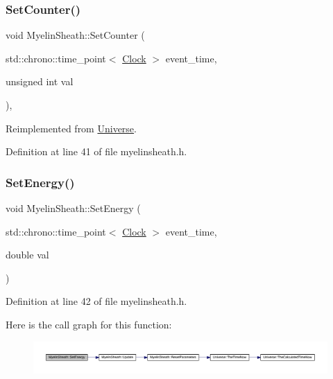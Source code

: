 \subsubsection{\texorpdfstring{Set\+Counter()}{SetCounter()}}
{\footnotesize\ttfamily void Myelin\+Sheath\+::\+Set\+Counter (\begin{DoxyParamCaption}\item[{std\+::chrono\+::time\+\_\+point$<$ \hyperlink{universe_8h_a0ef8d951d1ca5ab3cfaf7ab4c7a6fd80}{Clock} $>$}]{event\+\_\+time,  }\item[{unsigned int}]{val }\end{DoxyParamCaption})\hspace{0.3cm}{\ttfamily [inline]}, {\ttfamily [virtual]}}



Reimplemented from \hyperlink{class_universe_aa22202ae740eb1355529afcb13285e91}{Universe}.



Definition at line 41 of file myelinsheath.\+h.

\mbox{\label{class_myelin_sheath_ad0f6dbae2819f6642a92b8e85ec8f775}} 
\subsubsection{\texorpdfstring{Set\+Energy()}{SetEnergy()}}
{\footnotesize\ttfamily void Myelin\+Sheath\+::\+Set\+Energy (\begin{DoxyParamCaption}\item[{std\+::chrono\+::time\+\_\+point$<$ \hyperlink{universe_8h_a0ef8d951d1ca5ab3cfaf7ab4c7a6fd80}{Clock} $>$}]{event\+\_\+time,  }\item[{double}]{val }\end{DoxyParamCaption})\hspace{0.3cm}{\ttfamily [inline]}}



Definition at line 42 of file myelinsheath.\+h.

Here is the call graph for this function\+:
\nopagebreak
\begin{figure}[H]
\begin{center}
\leavevmode
\includegraphics[width=350pt]{class_myelin_sheath_ad0f6dbae2819f6642a92b8e85ec8f775_cgraph}
\end{center}
\end{figure}
\mbox{\label{class_myelin_sheath_af53c8f36ee963168dec09b74a6be8e4c}} 
